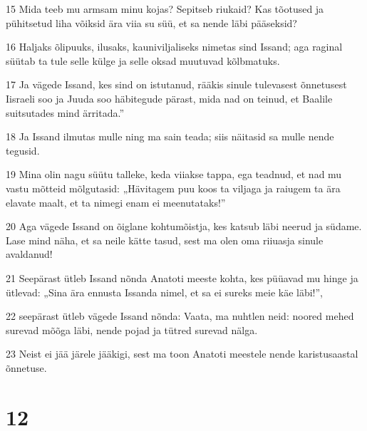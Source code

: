\par 15 Mida teeb mu armsam minu kojas? Sepitseb riukaid? Kas tõotused ja pühitsetud liha võiksid ära viia su süü, et sa nende läbi pääseksid?
\par 16 Haljaks õlipuuks, ilusaks, kauniviljaliseks nimetas sind Issand; aga raginal süütab ta tule selle külge ja selle oksad muutuvad kõlbmatuks.
\par 17 Ja vägede Issand, kes sind on istutanud, rääkis sinule tulevasest õnnetusest Iisraeli soo ja Juuda soo häbitegude pärast, mida nad on teinud, et Baalile suitsutades mind ärritada.”
\par 18 Ja Issand ilmutas mulle ning ma sain teada; siis näitasid sa mulle nende tegusid.
\par 19 Mina olin nagu süütu talleke, keda viiakse tappa, ega teadnud, et nad mu vastu mõtteid mõlgutasid: „Hävitagem puu koos ta viljaga ja raiugem ta ära elavate maalt, et ta nimegi enam ei meenutataks!”
\par 20 Aga vägede Issand on õiglane kohtumõistja, kes katsub läbi neerud ja südame. Lase mind näha, et sa neile kätte tasud, sest ma olen oma riiuasja sinule avaldanud!
\par 21 Seepärast ütleb Issand nõnda Anatoti meeste kohta, kes püüavad mu hinge ja ütlevad: „Sina ära ennusta Issanda nimel, et sa ei sureks meie käe läbi!”,
\par 22 seepärast ütleb vägede Issand nõnda: Vaata, ma nuhtlen neid: noored mehed surevad mõõga läbi, nende pojad ja tütred surevad nälga.
\par 23 Neist ei jää järele jääkigi, sest ma toon Anatoti meestele nende karistusaastal õnnetuse.

\chapter{12}

